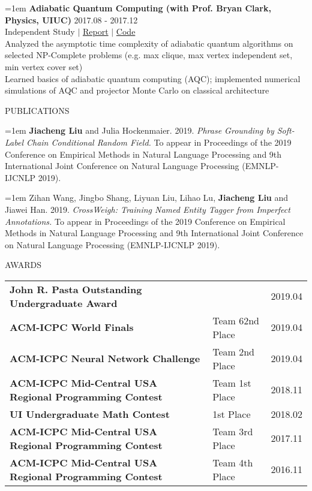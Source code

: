 \documentclass[10pt]{article}
\begin{document}
\hangindent=1em
\textbf{Adiabatic Quantum Computing (with Prof. Bryan Clark, Physics, UIUC)} \hfill 2017.08 - 2017.12 \\
Independent Study $|$ \href{https://github.com/liujch1998/AQC/blob/master/report/report.pdf}{Report} $|$ \href{https://github.com/liujch1998/AQC}{Code} \\
Analyzed the asymptotic time complexity of adiabatic quantum algorithms on selected NP-Complete problems (e.g. max clique, max vertex independent set, min vertex cover set) \\
Learned basics of adiabatic quantum computing (AQC); implemented numerical simulations of AQC and projector Monte Carlo on classical architecture

\vspace{1em}
{\LARGE PUBLICATIONS}

\hangindent=1em
\textbf{Jiacheng Liu} and Julia Hockenmaier. 2019. \emph{Phrase Grounding by Soft-Label Chain Conditional Random Field.} To appear in Proceedings of the 2019 Conference on Empirical Methods in Natural Language Processing and 9th International Joint Conference on Natural Language Processing (EMNLP-IJCNLP 2019). 

\hangindent=1em
Zihan Wang, Jingbo Shang, Liyuan Liu, Lihao Lu, \textbf{Jiacheng Liu} and Jiawei Han. 2019. \emph{CrossWeigh: Training Named Entity Tagger from Imperfect Annotations.} To appear in Proceedings of the 2019 Conference on Empirical Methods in Natural Language Processing and 9th International Joint Conference on Natural Language Processing (EMNLP-IJCNLP 2019). 

\newpage

\vspace{1em}
{\LARGE AWARDS}

\begin{tabularx}{\textwidth}{X l r}
\textbf{John R. Pasta Outstanding Undergraduate Award} & & 2019.04 \\
\textbf{ACM-ICPC World Finals} & Team 62nd Place & 2019.04 \\
\textbf{ACM-ICPC Neural Network Challenge} & Team 2nd Place & 2019.04 \\
\textbf{ACM-ICPC Mid-Central USA Regional Programming Contest} & Team 1st Place & 2018.11 \\
\textbf{UI Undergraduate Math Contest} & 1st Place & 2018.02 \\
\textbf{ACM-ICPC Mid-Central USA Regional Programming Contest} & Team 3rd Place & 2017.11 \\
\textbf{ACM-ICPC Mid-Central USA Regional Programming Contest} & Team 4th Place & 2016.11
\end{tabularx}
\end{document}
